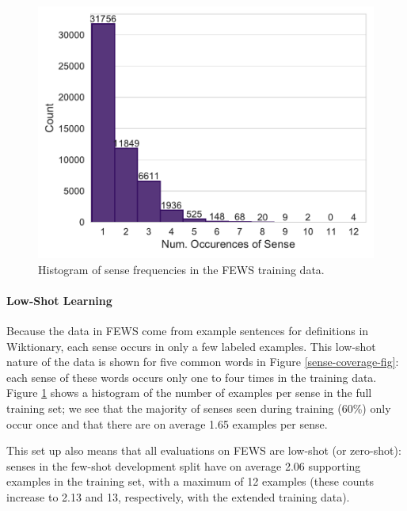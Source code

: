 \documentclass[11pt,a4paper]{article}
\begin{document}
\begin{figure}[t]
\centering
\includegraphics[width=0.8\linewidth]{figures/train-hist.pdf}
\caption{Histogram of sense frequencies in the FEWS training data.}
\label{fewshot-hist}
\end{figure}

\paragraph{Low-Shot Learning}
Because the data in FEWS come from example sentences for definitions in Wiktionary, each sense occurs in only a few labeled examples. This low-shot nature of the data is shown for five common words in Figure \ref{sense-coverage-fig}: each sense of these words occurs only one to four times in the training data. Figure \ref{fewshot-hist} shows a histogram of the number of examples per sense in the full training set; we see that the majority of senses seen during training (60\%) only occur once and that there are on average 1.65 examples per sense. 

This set up also means that all evaluations on FEWS are low-shot (or zero-shot): senses in the few-shot development split have on average 2.06 supporting examples in the training set, with a maximum of 12 examples (these counts increase to 2.13 and 13, respectively, with the extended training data).
\end{document}
